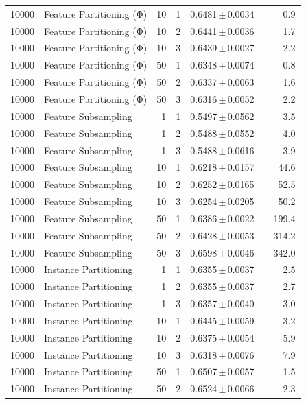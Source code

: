 \begin{table}[ht]
\begin{tabular}{rlrrccr}
10000 & Feature Partitioning (Φ) & 10 & 1 & 0.6481\,$\pm$\,0.0034 &  & 0.9 \\
10000 & Feature Partitioning (Φ) & 10 & 2 & 0.6441\,$\pm$\,0.0036 &  & 1.7 \\
10000 & Feature Partitioning (Φ) & 10 & 3 & 0.6439\,$\pm$\,0.0027 &  & 2.2 \\
10000 & Feature Partitioning (Φ) & 50 & 1 & 0.6348\,$\pm$\,0.0074 &  & 0.8 \\
10000 & Feature Partitioning (Φ) & 50 & 2 & 0.6337\,$\pm$\,0.0063 &  & 1.6 \\
10000 & Feature Partitioning (Φ) & 50 & 3 & 0.6316\,$\pm$\,0.0052 &  & 2.2 \\
10000 & Feature Subsampling & 1 & 1 & 0.5497\,$\pm$\,0.0562 &  & 3.5 \\
10000 & Feature Subsampling & 1 & 2 & 0.5488\,$\pm$\,0.0552 &  & 4.0 \\
10000 & Feature Subsampling & 1 & 3 & 0.5488\,$\pm$\,0.0616 &  & 3.9 \\
10000 & Feature Subsampling & 10 & 1 & 0.6218\,$\pm$\,0.0157 &  & 44.6 \\
10000 & Feature Subsampling & 10 & 2 & 0.6252\,$\pm$\,0.0165 &  & 52.5 \\
10000 & Feature Subsampling & 10 & 3 & 0.6254\,$\pm$\,0.0205 &  & 50.2 \\
10000 & Feature Subsampling & 50 & 1 & 0.6386\,$\pm$\,0.0022 &  & 199.4 \\
10000 & Feature Subsampling & 50 & 2 & 0.6428\,$\pm$\,0.0053 &  & 314.2 \\
10000 & Feature Subsampling & 50 & 3 & 0.6598\,$\pm$\,0.0046 &  & 342.0 \\
10000 & Instance Partitioning & 1 & 1 & 0.6355\,$\pm$\,0.0037 &  & 2.5 \\
10000 & Instance Partitioning & 1 & 2 & 0.6355\,$\pm$\,0.0037 &  & 2.7 \\
10000 & Instance Partitioning & 1 & 3 & 0.6357\,$\pm$\,0.0040 &  & 3.0 \\
10000 & Instance Partitioning & 10 & 1 & 0.6445\,$\pm$\,0.0059 &  & 3.2 \\
10000 & Instance Partitioning & 10 & 2 & 0.6375\,$\pm$\,0.0054 &  & 5.9 \\
10000 & Instance Partitioning & 10 & 3 & 0.6318\,$\pm$\,0.0076 &  & 7.9 \\
10000 & Instance Partitioning & 50 & 1 & 0.6507\,$\pm$\,0.0057 &  & 1.5 \\
10000 & Instance Partitioning & 50 & 2 & 0.6524\,$\pm$\,0.0066 &  & 2.3 \\

\end{tabular}
\end{table}
